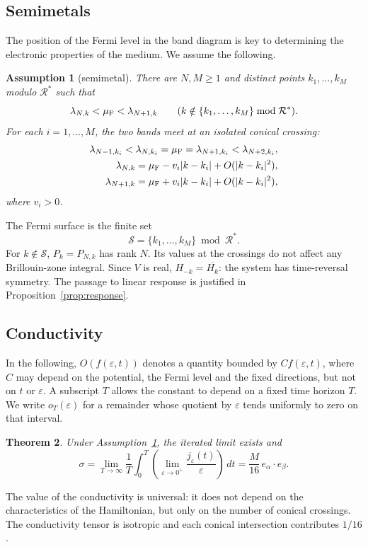 \documentclass[a4paper,11pt]{article}
\theoremstyle{plain}
\newtheorem{theorem}{Theorem}[section]
\newtheorem{assumption}[theorem]{Assumption}
\theoremstyle{remark}
\def\eps{{\varepsilon}}
\def\cR{{\mathcal R}}
\begin{document}
\subsection{Semimetals}\label{sec:semimetal-assumptions}
The position of the Fermi level in the band diagram is key to determining
the electronic properties of the medium. We assume the following.
\begin{assumption}[semimetal]\label{ass:semimetal}
There are $N,M\ge1$ and distinct points $k_1,\ldots,k_M$ modulo $\cR^*$ such that
\[
\lambda_{N,k}<\mu_{\rm F}<\lambda_{N+1,k}\qquad
(k\notin\{k_1,\ldots,k_M\}\bmod\cR^*).
\]
For each $i=1,\ldots,M$, the two bands meet at an isolated conical crossing:
\begin{align}
\lambda_{N-1,k_i}<\lambda_{N,k_i}=\mu_{\rm F}
=\lambda_{N+1,k_i}<\lambda_{N+2,k_i},\label{hyp:semimetals_1}\\
\lambda_{N,k}=\mu_{\rm F}-v_i|k-k_i|+O(|k-k_i|^2),\label{hyp:semimetals_2}\\
\lambda_{N+1,k}=\mu_{\rm F}+v_i|k-k_i|+O(|k-k_i|^2),\label{hyp:semimetals_3}
\end{align}
where $v_i>0$.
\end{assumption}
The Fermi surface is the finite set
\begin{equation}\label{eq:Fermi_surface}
\mathcal S=\{k_1,\ldots,k_M\}\bmod\cR^*.
\end{equation}
For $k\notin\mathcal S$, $P_k=P_{N,k}$ has rank $N$. Its values at the
crossings do not affect any Brillouin-zone integral. Since $V$ is real,
$H_{-k}=\overline{H_k}$: the system has time-reversal symmetry.
The passage to linear response is justified in
Proposition~\ref{prop:response}.


\subsection{Conductivity}
In the following, $O(f(\eps,t))$ denotes a quantity bounded by $Cf(\eps,t)$,
where $C$ may depend on the potential, the Fermi level and the fixed
directions, but not on $t$ or $\eps$. A subscript $T$ allows the constant
to depend on a fixed time horizon $T$. We write $o_T(\eps)$ for a
remainder whose quotient by $\eps$ tends uniformly to zero on that interval.
\begin{theorem}\label{theo:semi-metal}
Under Assumption~\ref{ass:semimetal}, the iterated limit exists and
\[
\sigma=\lim_{T\to\infty}\frac1T\int_0^T
\left(\lim_{\eps\to0^+}\frac{j_\eps(t)}{\eps}\right)\,dt
=\frac{M}{16}\,e_\alpha\cdot e_\beta.
\]
\end{theorem}
The value of the conductivity is universal: it does not depend on the
characteristics of the Hamiltonian, but only on the number of conical
crossings. The conductivity tensor is isotropic and each conical
intersection contributes $1/16$.
\end{document}
